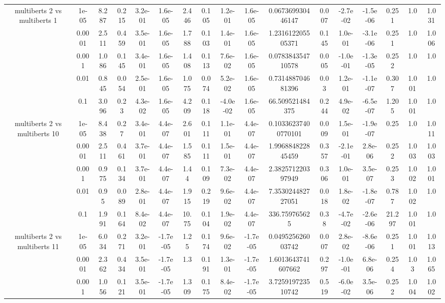 \begin{tabular}{|c|c|c|c|c|c|c|c|c|c|c|c|c|c|c|c|c|}
\hline
\multirow{5}{*}{multiberts 2 vs multiberts 1} & 1e-05 & 8.287 & 0.215 & 3.2e-01 & 1.6e-05 & 2.446 & 0.105 & 1.2e-01 & 1.6e-05 & 0.067369930446147 & 0.007 & -2.7e-02 & -1.5e-06 & 0.251 & 1.0 & 1.031 \\
 & 0.0001 & 2.511 & 0.459 & 3.5e-01 & 1.6e-05 & 1.788 & 0.103 & 1.4e-01 & 1.6e-05 & 1.231612205505371 & 0.145 & 1.0e-01 & -3.1e-06 & 0.251 & 1.0 & 1.006 \\
 & 0.001 & 1.086 & 0.145 & 3.4e-01 & 1.6e-05 & 1.408 & 0.113 & 7.6e-02 & 1.6e-05 & 0.078384354710578 & 0.005 & -1.0e-01 & -1.3e-05 & 0.252 & 1.0 & 1.0 \\
 & 0.01 & 0.845 & 0.054 & 2.5e-01 & 1.6e-05 & 1.075 & 0.074 & 5.2e-02 & 1.6e-05 & 0.731488704681396 & 0.03 & 1.2e-01 & -1.1e-07 & 0.307 & 1.001 & 1.0 \\
 & 0.1 & 3.096 & 0.23 & 4.3e-02 & 1.6e-05 & 4.209 & 0.118 & -4.0e-02 & 1.6e-05 & 66.509521484375 & 0.244 & 4.9e-02 & -6.5e-07 & 1.205 & 1.001 & 1.0 \\
\hline
\multirow{5}{*}{multiberts 2 vs multiberts 10} & 1e-05 & 8.438 & 0.27 & 3.4e-01 & 4.4e-07 & 2.601 & 0.111 & 1.1e-01 & 4.4e-07 & 0.10336237400770101 & 0.009 & 1.5e-01 & -1.9e-07 & 0.25 & 1.0 & 1.011 \\
 & 0.0001 & 2.511 & 0.461 & 3.7e-01 & 4.4e-07 & 1.585 & 0.111 & 1.5e-01 & 4.4e-07 & 1.996884822845459 & 0.357 & -2.1e-01 & 2.8e-06 & 0.252 & 1.003 & 1.003 \\
 & 0.001 & 0.975 & 0.134 & 3.7e-01 & 4.4e-07 & 1.44 & 0.109 & 7.3e-02 & 4.4e-07 & 2.382571220397949 & 0.306 & 1.0e-01 & 3.5e-07 & 0.253 & 1.002 & 1.001 \\
 & 0.01 & 0.95 & 0.089 & 2.8e-01 & 4.4e-07 & 1.915 & 0.219 & 9.6e-02 & 4.4e-07 & 7.353024482727051 & 0.018 & 1.8e-02 & -1.8e-07 & 0.787 & 1.002 & 1.0 \\
 & 0.1 & 1.991 & 0.164 & 8.4e-02 & 4.4e-07 & 10.75 & 0.104 & 1.9e-02 & 4.4e-07 & 336.759765625 & 0.38 & -4.7e-02 & -2.6e-06 & 21.297 & 1.001 & 1.0 \\
\hline
\multirow{5}{*}{multiberts 2 vs multiberts 11} & 1e-05 & 6.034 & 0.271 & 3.2e-01 & -1.7e-05 & 1.25 & 0.174 & 9.6e-02 & -1.7e-05 & 0.049525626003742 & 0.007 & 2.8e-02 & -8.6e-06 & 0.251 & 1.001 & 1.013 \\
 & 0.0001 & 2.362 & 0.434 & 3.5e-01 & -1.7e-05 & 1.3 & 0.191 & 1.3e-01 & -1.7e-05 & 1.6013643741607662 & 0.297 & -1.0e-01 & 6.8e-06 & 0.254 & 1.03 & 1.065 \\
 & 0.001 & 1.056 & 0.121 & 3.5e-01 & -1.7e-05 & 1.309 & 0.175 & 8.4e-02 & -1.7e-05 & 3.725919723510742 & 0.519 & -6.0e-02 & 3.5e-06 & 0.252 & 1.004 & 1.002 \\

\end{tabular}
